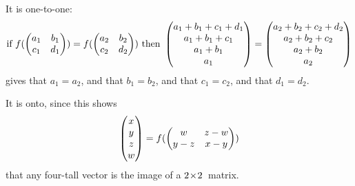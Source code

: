 \begin{exercises}
\begin{answer}
\begin{exparts}
        It is one-to-one:
        \begin{equation*}
          \text{if }
          f(\begin{pmatrix}
              a_1  &b_1  \\
              c_1  &d_1
            \end{pmatrix})
         =f(\begin{pmatrix}
              a_2  &b_2  \\
              c_2  &d_2
            \end{pmatrix})
          \text{ then }
          \begin{pmatrix} a_1+b_1+c_1+d_1 \\ a_1+b_1+c_1 \\ a_1+b_1 \\ a_1 \end{pmatrix}
          =\begin{pmatrix} a_2+b_2+c_2+d_2 \\ a_2+b_2+c_2 \\ a_2+b_2 \\ a_2 \end{pmatrix}
        \end{equation*}
        gives that \( a_1=a_2 \), and that \( b_1=b_2 \), 
        and that \( c_1=c_2 \), and that \( d_1=d_2 \).

        It is onto, since this shows
        \begin{equation*}
          \begin{pmatrix} x \\ y \\ z \\ w \end{pmatrix}
         =f(\begin{pmatrix}
              w    &z-w  \\
              y-z  &x-y
            \end{pmatrix})
        \end{equation*}
        that any four-tall vector is the image of a $2 \! \times \! 2$~matrix.


\end{exparts}
\end{answer}
\end{exercises}
